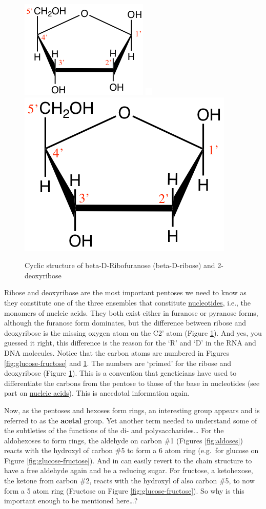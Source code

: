 \documentclass[]{book}
\theoremstyle{definition}
\theoremstyle{definition}
\theoremstyle{definition}
\theoremstyle{remark}
\begin{document}
\begin{figure}

{\centering \includegraphics[width=0.25\linewidth]{pictures/ribose-haworth} \includegraphics[width=0.25\linewidth]{pictures/blank} \includegraphics[width=0.25\linewidth]{pictures/deoxyribose-haworth} 

}

\caption{Cyclic structure of beta-D-Ribofuranose (beta-D-ribose) and 2-deoxyribose }\label{fig:riboses}
\end{figure}

Ribose and deoxyribose are the most important pentoses we need to know
as they constitute one of the three ensembles that constitute
\protect\hyperlink{Nucleic-acids}{nucleotides}, i.e., the monomers of
nucleic acids. They both exist either in furanose or pyranose forms,
although the furanose form dominates, but the difference between ribose
and deoxyribose is the missing oxygen atom on the C2' atom (Figure
\ref{fig:riboses}). And yes, you guessed it right, this difference is
the reason for the `R' and `D' in the RNA and DNA molecules. Notice that
the carbon atoms are numbered in Figures \ref{fig:glucose-fructose} and
\ref{fig:riboses}. The numbers are `primed' for the ribose and
deoxyribose (Figure \ref{fig:riboses}). This is a convention that
geneticians have used to differentiate the carbons from the pentose to
those of the base in nucleotides (see part on
\protect\hyperlink{nucleic-acids}{nucleic acids}). This is anecdotal
information again.

Now, as the pentoses and hexoses form rings, an interesting group
appears and is referred to as the \textbf{acetal} group. Yet another
term needed to understand some of the subtleties of the functions of the
di- and polysaccharides\ldots{} For the aldohexoses to form rings, the
aldehyde on carbon \#1 (Figures \ref{fig:aldoses}) reacts with the
hydroxyl of carbon \#5 to form a 6 atom ring (e.g.~for glucose on Figure
\ref{fig:glucose-fructose}). And in can easily revert to the chain
structure to have a free aldehyde again and be a reducing sugar. For
fructose, a ketohexose, the ketone from carbon \#2, reacts with the
hydroxyl of also carbon \#5, to now form a 5 atom ring (Fructose on
Figure \ref{fig:glucose-fructose}). So why is this important enough to
be mentioned here\ldots{}?
\end{document}
